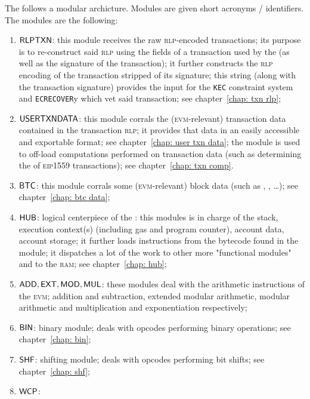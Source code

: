 The \zkEvm{} follows a modular archicture. Modules are given short acronyms / identifiers. The modules are the following:
\begin{enumerate}
	\item $\textsf{RLPTXN}$:
		this module receives the raw \textsc{rlp}-encoded transactions;
		its purpose is to re-construct said \textsc{rlp} using the fields of a transaction used by the \zkEvm{} (as well as the signature of the transaction);
		it further constructs the \textsc{rlp} encoding of the transaction stripped of its signature;
		this string (along with the transaction signature) provides the input for the \texttt{KEC} constraint system and \texttt{ECRECOVER}y which vet said transaction;
		see chapter~\ref{chap: txn rlp};
	\item $\textsf{USERTXNDATA}{}$:
		this module corrals the (\textsc{evm}-relevant) transaction data contained in the transaction \textsc{rlp};
		it provides that data in an easily accessible and exportable format;
		see chapter~\ref{chap: user txn data};
		\saNote{} the \btcMod{} module is used to off-load computations performed on transaction data (such as determining the  of \textsc{eip1559} transactions); see chapter~\ref{chap: txn comp}.
	\item $\textsf{BTC}{}$:
		this module corrals some (\textsc{evm}-relevant) block data (such as , , \dots);
		see chapter~\ref{chap: btc data};
	\item $\textsf{HUB}{}$:
		logical centerpiece of the \zkEvm{}: this modules is in charge of the stack, execution context(s) (including gas and program counter), account data, account storage;
		it further loads instructions from the bytecode found in the \romMod{} module;
		it dispatches a lot of the work to other more "functional modules" and to the \textsc{ram};
		see chapter~\ref{chap: hub};
	\item $\textsf{ADD}{}, \textsf{EXT}{}, \textsf{MOD}{}, \textsf{MUL}{}$:
		these modules deal with the arithmetic instructions of the \textsc{evm};
		addition and subtraction, extended modular arithmetic, modular arithmetic and multiplication and exponentiation respectively;
	\item $\textsf{BIN}{}$:
		binary module;
		deals with opcodes performing binary operations;
		see chapter~\ref{chap: bin};
	\item $\textsf{SHF}{}$:
		shifting module;
		deals with opcodes performing bit shifts;
		see chapter~\ref{chap: shf};
	\item $\textsf{WCP}{}$:

\end{enumerate}
